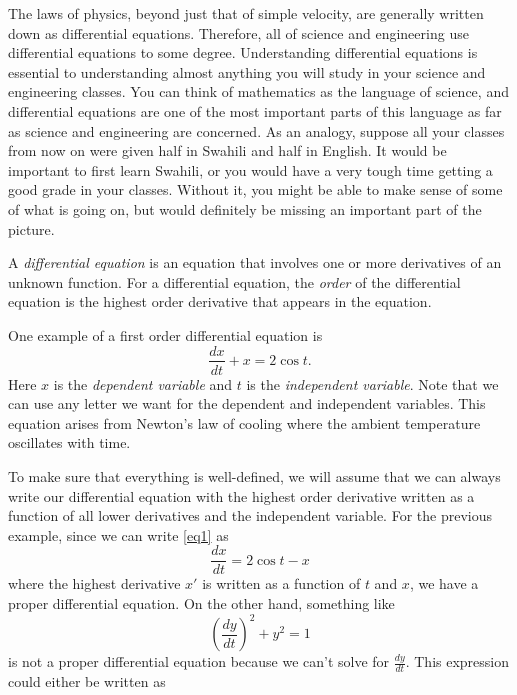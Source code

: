 \documentclass{ximera}
\begin{document}
The laws of physics, beyond just that of simple velocity, are generally written down as differential equations.  Therefore, all of science and engineering use differential equations to some degree.  Understanding differential equations is essential to understanding almost anything you will study in your science and engineering classes. You can think of mathematics as the language of science, and differential equations are one of the most important parts of this language as far as science and engineering are concerned.  As an analogy, suppose all your classes from now on were given half in Swahili and half in English. It would be important to first learn Swahili, or you would have a very tough time getting a good grade in your classes. Without it, you might be able to make sense of some of what is going on, but would definitely be missing an important part of the picture. 


\begin{definition}
    A \emph{differential equation} is an equation that involves one or more derivatives of an unknown function. For a differential equation, the \emph{order} of the differential equation is the highest order derivative that appears in the equation. 
\end{definition}

One example of a first order differential equation is
\begin{equation} \label{eq1}
    \frac{dx}{dt} + x = 2 \cos t .
\end{equation}
Here $x$ is the \emph{dependent variable} and $t$ is the \emph{independent variable}. Note that we can use any letter we want for the dependent and independent variables. This equation arises from Newton's law of cooling where the ambient
temperature oscillates with time. 

To make sure that everything is well-defined, we will assume that we can always write our differential equation with the highest order derivative written as a function of all lower derivatives and the independent variable. For the previous example, since we can write \eqref{eq1} as 
\[ 
    \frac{dx}{dt} = 2\cos t - x 
\] 
where the highest derivative $x'$ is written as a function of $t$ and $x$, we have a proper differential equation. On the other hand, something like
\begin{equation}
    \left(\frac{dy}{dt}\right)^2 + y^2 = 1 \label{eqNonDiff}
\end{equation}
is not a proper differential equation because we can't solve for $\frac{dy}{dt}$. This expression could either be written as
\end{document}
